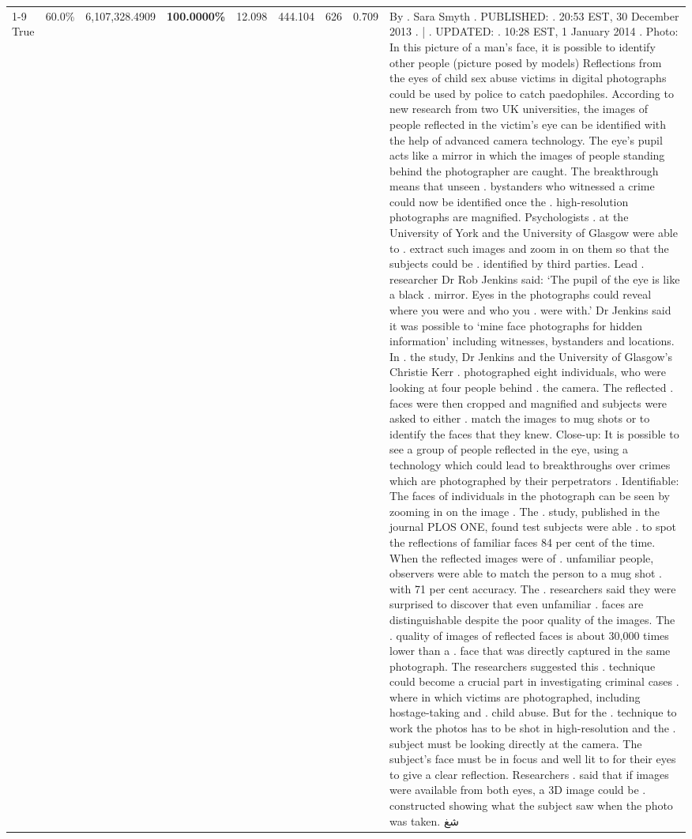 \begin{table}[H]
\begin{tabular}{lllrlllll}
\cline{1-9}
True & 60.0\% & 6,107,328.4909 & \bfseries \color{red} 100.0000\% & 12.098 & 444.104 & 626 & 0.709 & By . Sara Smyth . PUBLISHED: . 20:53 EST, 30 December 2013 . | . UPDATED: . 10:28 EST, 1 January 2014 . Photo: In this picture of a man's face, it is possible to identify other people (picture posed by models) Reflections from the eyes of child sex abuse victims in digital photographs could be used by police to catch paedophiles. According to new research from two UK universities, the images of people reflected in the victim's eye can be identified with the help of advanced camera technology. The eye's pupil acts like a mirror in which the images of people standing behind the photographer are caught. The breakthrough means that unseen . bystanders who witnessed a crime could now be identified once the . high-resolution photographs are magnified. Psychologists . at the University of York and the University of Glasgow were able to . extract such images and zoom in on them so that the subjects could be . identified by third parties. Lead . researcher Dr Rob Jenkins said: ‘The pupil of the eye is like a black . mirror. Eyes in the photographs could reveal where you were and who you . were with.' Dr Jenkins said it was possible to ‘mine face photographs for hidden information' including witnesses, bystanders and locations. In . the study, Dr Jenkins and the University of Glasgow's Christie Kerr . photographed eight individuals, who were looking at four people behind . the camera. The reflected . faces were then cropped and magnified and subjects were asked to either . match the images to mug shots or to identify the faces that they knew. Close-up: It is possible to see a group of people reflected in the eye, using a technology which could lead to breakthroughs over crimes which are photographed by their perpetrators . Identifiable: The faces of individuals in the photograph can be seen by zooming in on the image . The . study, published in the journal PLOS ONE, found test subjects were able . to spot the reflections of familiar faces 84 per cent of the time. When the reflected images were of . unfamiliar people, observers were able to match the person to a mug shot . with 71 per cent accuracy. The . researchers said they were surprised to discover that even unfamiliar . faces are distinguishable despite the poor quality of the images. The . quality of images of reflected faces is about 30,000 times lower than a . face that was directly captured in the same photograph. The researchers suggested this . technique could become a crucial part in investigating criminal cases . where in which victims are photographed, including hostage-taking and . child abuse. But for the . technique to work the photos has to be shot in high-resolution and the . subject must be looking directly at the camera. The subject's face must be in focus and well lit to for their eyes to give a clear reflection. Researchers . said that if images were available from both eyes, a 3D image could be . constructed showing what the subject saw when the photo was taken. شغ \\

\end{tabular}
\end{table}
